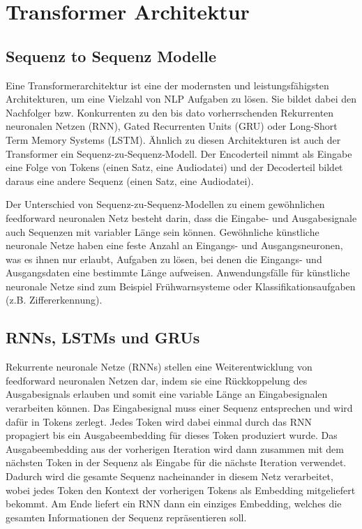 \section{Transformer Architektur}

\subsection{Sequenz to Sequenz Modelle}

Eine Transformerarchitektur ist eine der modernsten und leistungsfähigsten Architekturen, um eine Vielzahl von  NLP Aufgaben zu lösen. 
Sie bildet dabei den Nachfolger bzw. Konkurrenten zu den bis dato vorherrschenden Rekurrenten neuronalen Netzen (RNN), Gated Recurrenten Units (GRU) oder Long-Short Term Memory Systems (LSTM). 
Ähnlich zu diesen Architekturen ist auch der Transformer ein Sequenz-zu-Sequenz-Modell. 
Der Encoderteil nimmt als Eingabe eine Folge von Tokens (einen Satz, eine Audiodatei) und der Decoderteil bildet daraus eine andere Sequenz (einen Satz, eine Audiodatei). 

Der Unterschied von Sequenz-zu-Sequenz-Modellen zu einem gewöhnlichen feedforward neuronalen Netz besteht darin, dass die Eingabe- und Ausgabesignale auch Sequenzen mit variabler Länge sein können.
Gewöhnliche künstliche neuronale Netze haben eine feste Anzahl an Eingangs- und Ausgangsneuronen, was es ihnen nur erlaubt, Aufgaben zu lösen, bei denen die Eingangs- und Ausgangsdaten eine bestimmte Länge aufweisen.
Anwendungsfälle für künstliche neuronale Netze sind zum Beispiel Frühwarnsysteme oder Klassifikationsaufgaben (z.B. Ziffererkennung).

\subsection{RNNs, LSTMs und GRUs}

Rekurrente neuronale Netze (RNNs) stellen eine Weiterentwicklung von feedforward neuronalen Netzen dar, indem sie eine Rückkoppelung des Ausgabesignals erlauben und somit eine variable Länge an Eingabesignalen verarbeiten können.
Das Eingabesignal muss einer Sequenz entsprechen und wird dafür in Tokens zerlegt.
Jedes Token wird dabei einmal durch das RNN propagiert bis ein Ausgabeembedding für dieses Token produziert wurde.
Das Ausgabeembedding aus der vorherigen Iteration wird dann zusammen mit dem nächsten Token in der Sequenz als Eingabe für die nächste Iteration verwendet.
Dadurch wird die gesamte Sequenz nacheinander in diesem Netz verarbeitet, wobei jedes Token den Kontext der vorherigen Tokens als Embedding mitgeliefert bekommt.
Am Ende liefert ein RNN dann ein einziges Embedding, welches die gesamten Informationen der Sequenz repräsentieren soll.

